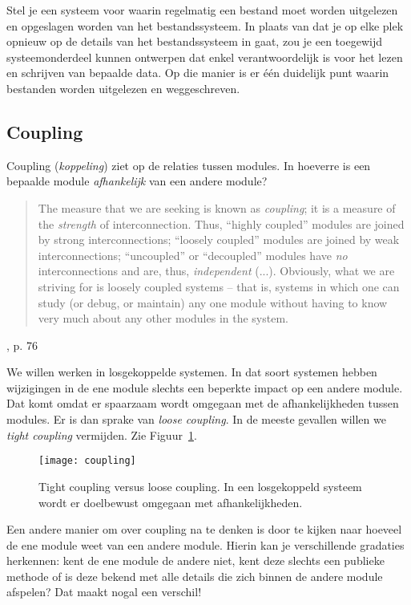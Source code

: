 Stel je een systeem voor waarin regelmatig een bestand moet worden uitgelezen
en opgeslagen worden van het bestandssysteem. In plaats van dat je op elke plek 
opnieuw op de details van het bestandssysteem in gaat, zou je een toegewijd systeemonderdeel kunnen 
ontwerpen dat enkel verantwoordelijk is voor het lezen en schrijven van bepaalde data.
Op die manier is er één duidelijk punt waarin bestanden worden uitgelezen en weggeschreven.

\subsection{Coupling}
Coupling (\emph{koppeling}) ziet op de relaties tussen modules.
In hoeverre is een bepaalde module \emph{afhankelijk} van een andere module?
\blockquote{
The measure that we are seeking is known as \emph{coupling};
it is a measure of the \emph{strength} of interconnection. 
Thus, ``highly coupled'' modules are joined by strong 
interconnections; ``loosely coupled'' modules are joined by
weak interconnections; ``uncoupled'' or ``decoupled'' modules 
have \emph{no} interconnections and are, thus, \emph{independent}
(...). 
\newline\newline
Obviously, what we are striving for is loosely coupled systems
-- that is, systems in which one can study (or debug, or maintain)
any one module without having to know very much about any other
modules in the system.
}{\cite{YourdonConstantine1979}, p. 76}

We willen werken in losgekoppelde systemen. In dat soort systemen
hebben wijzigingen in de ene module slechts een beperkte impact 
op een andere module. Dat komt omdat er spaarzaam wordt omgegaan 
met de afhankelijkheden tussen modules. Er is dan sprake van
\emph{loose coupling}. In de meeste gevallen willen we 
\emph{tight coupling} vermijden. Zie Figuur~\ref{fig:coupling}.

\begin{figure}[H]
    \centering
    \texttt{[image: coupling]}
    \caption{Tight coupling versus loose coupling.
    In een losgekoppeld systeem wordt er doelbewust omgegaan 
    met afhankelijkheden.}
    \label{fig:coupling}
\end{figure}

Een andere manier om over coupling na te denken is door te kijken naar hoeveel 
de ene module weet van een andere module. Hierin kan je verschillende gradaties
herkennen: kent de ene module de andere niet, kent deze slechts een publieke methode 
of is deze bekend met alle details die zich binnen de andere module afspelen?
Dat maakt nogal een verschil!

